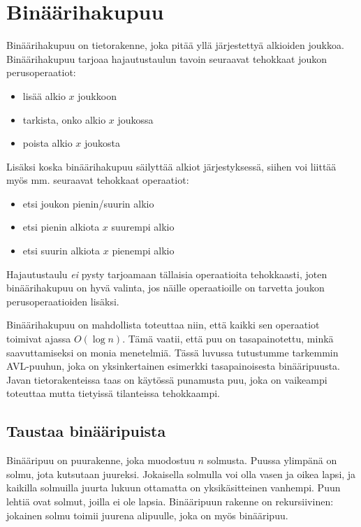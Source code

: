 \chapter{Binäärihakupuu}

Binäärihakupuu on tietorakenne, joka pitää yllä järjestettyä
alkioiden joukkoa. Binäärihakupuu tarjoaa hajautustaulun tavoin
seuraavat tehokkaat joukon perusoperaatiot:

\begin{itemize}
\item lisää alkio $x$ joukkoon
\item tarkista, onko alkio $x$ joukossa
\item poista alkio $x$ joukosta
\end{itemize}

Lisäksi koska binäärihakupuu säilyttää alkiot järjestyksessä,
siihen voi liittää myös mm. seuraavat tehokkaat operaatiot:

\begin{itemize}
\item etsi joukon pienin/suurin alkio
\item etsi pienin alkiota $x$ suurempi alkio
\item etsi suurin alkiota $x$ pienempi alkio
\end{itemize}

Hajautustaulu \emph{ei} pysty tarjoamaan tällaisia operaatioita
tehokkaasti, joten binäärihakupuu on hyvä valinta, jos näille
operaatioille on tarvetta joukon perusoperaatioiden lisäksi.

Binäärihakupuu on mahdollista toteuttaa niin,
että kaikki sen operaatiot toimivat ajassa $O(\log n)$.
Tämä vaatii, että puu on tasapainotettu, minkä saavuttamiseksi
on monia menetelmiä.
Tässä luvussa tutustumme tarkemmin AVL-puuhun, joka on
yksinkertainen esimerkki tasapainoisesta binääripuusta.
Javan tietorakenteissa taas on käytössä punamusta puu,
joka on vaikeampi toteuttaa mutta tietyissä tilanteissa tehokkaampi.

\section{Taustaa binääripuista}

Binääripuu on puurakenne, joka muodostuu $n$ solmusta.
Puussa ylimpänä on solmu, jota kutsutaan juureksi.
Jokaisella solmulla voi olla vasen ja oikea lapsi,
ja kaikilla solmuilla juurta lukuun ottamatta on yksikäsitteinen vanhempi.
Puun lehtiä ovat solmut, joilla ei ole lapsia.
Binääripuun rakenne on rekursiivinen:
jokainen solmu toimii juurena alipuulle,
joka on myös binääripuu.

